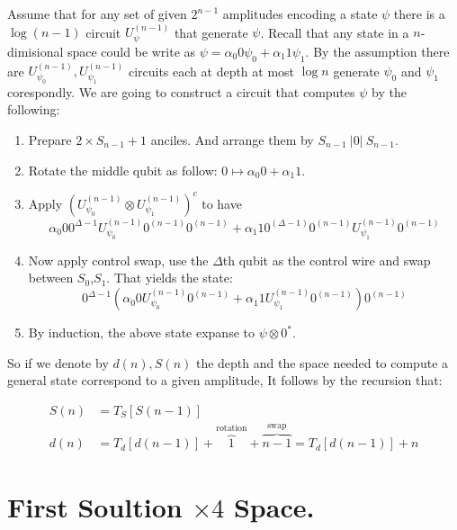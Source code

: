\documentclass[manuscript,screen,review]{acmart}
\begin{document}
Assume that for any set of given $2^{n-1}$ amplitudes encoding a state $\psi$ there is a $\log(n-1)$ circuit $U_{\psi}^{(n-1)}$ that generate $\psi$. Recall that any state in a $n$-dimisional space could be write as $\psi = \alpha_{0} 0 \psi_{0} + \alpha_{1} 1 \psi_{1} $. By the assumption there are $U_{\psi_{0}}^{(n-1)},U_{\psi_{1}}^{(n-1)}$ circuits each at depth at most $\log n$ generate $\psi_{0}$ and $\psi_{1}$ corespondly. We are going to construct a circuit that computes $\psi$ by the following: 
\begin{enumerate}
  \item Prepare $2 \times S_{n-1} + 1$ anciles. And arrange them by $S_{n-1} \ |0| \ S_{n-1}$. 
  \item Rotate the middle qubit as follow: $ 0 \mapsto \alpha_{0} 0 + \alpha_{1} 1 $.   
  \item Apply $\left(U_{\psi_{0}}^{(n-1)} \otimes U_{\psi_{1}}^{(n-1)}\right)^{c} $ to have 
    \begin{equation*}
      \alpha_{0} 0 0^{\Delta -1} U_{\psi_{0}}^{(n-1)} 0^{(n-1)} 0^{(n-1)} + \alpha_{1} 1 0^{(\Delta - 1)}0^{(n-1)}U_{\psi_{1}}^{(n-1)}0^{(n-1)}
    \end{equation*}
  \item Now apply control swap, use the $\Delta$th qubit as the control wire and swap between $S_{0}$,$S_{1}$. That yields the state: 
    \begin{equation*} 0^{\Delta -1} \left(\alpha_{0} 0 U_{\psi_{0}}^{(n-1)} 0^{(n-1)} + \alpha_{1} 1 U_{\psi_{1}}^{(n-1)}0^{(n-1)} \right)0^{(n-1)} 
    \end{equation*}
\item By induction, the above state expanse to $\psi \otimes 0^{*}$.
\end{enumerate}
So if we denote by $d(n), S(n)$ the depth and the space needed to compute a general state correspond to a given amplitude, It follows by the recursion that: 

\begin{equation*}
\begin{split} 
S(n) &= T_{S}[S(n-1)]    \\
d(n) &= T_{d}[d(n-1)] + \overbrace{1}^{ \text{rotation} } + \overbrace{n-1}^{\text{swap}} =  T_{d}[d(n-1)] + n  
\end{split} 
\end{equation*}



\section{First Soultion $\times 4$ Space.}
\end{document}
